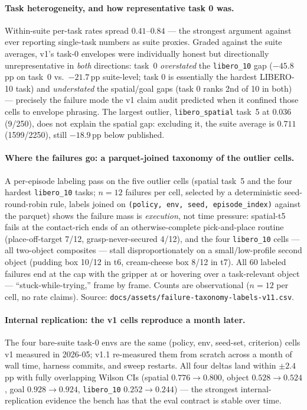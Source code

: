 \documentclass[10pt]{article}
\begin{document}
\paragraph{Task heterogeneity, and how representative task 0 was.}
Within-suite per-task rates spread $0.41$--$0.84$ --- the strongest
argument against ever reporting single-task numbers as suite proxies.
Graded against the
suite averages, v1's task-0 envelopes were individually honest but
directionally unrepresentative in \emph{both} directions: task~0
\emph{overstated} the \texttt{libero\_10} gap ($-45.8$\,pp on task~0 vs.\
$-21.7$\,pp suite-level; task 0 is essentially the hardest LIBERO-10
task) and \emph{understated} the spatial/goal gaps (task 0 ranks 2nd of
10 in both) --- precisely the failure mode the v1 claim audit predicted
when it confined those cells to envelope phrasing. The largest
outlier, \texttt{libero\_spatial} task~5 at $0.036$ (9/250), does not
explain the spatial gap: excluding it, the suite average is $0.711$
(1599/2250), still $-18.9$\,pp below published.

\paragraph{Where the failures go: a parquet-joined taxonomy of the
outlier cells.}
A per-episode labeling pass on the five outlier cells (spatial task~5 and
the four hardest \texttt{libero\_10} tasks; $n{=}12$ failures per cell,
selected by a deterministic seed-round-robin rule, labels joined on
\texttt{(policy, env, seed, episode\_index)} against the parquet) shows
the failure mass is \emph{execution}, not time pressure: spatial-t5
fails at the contact-rich ends of an otherwise-complete pick-and-place
routine (place-off-target 7/12, grasp-never-secured 4/12), and the four
\texttt{libero\_10} cells --- all two-object composites --- stall
disproportionately on a small/low-profile second object (pudding box
10/12 in t6, cream-cheese box 8/12 in t7). All 60 labeled failures end at
the cap with the gripper at or hovering over a task-relevant object ---
``stuck-while-trying,'' frame by frame. Counts are observational ($n{=}12$
per cell, no rate claims). Source:
\texttt{docs/assets/failure-taxonomy-labels-v11.csv}.

\paragraph{Internal replication: the v1 cells reproduce a month later.}
The four bare-suite task-0 envs are the same (policy, env, seed-set,
criterion) cells v1 measured in 2026-05; v1.1 re-measured them from
scratch across a month of wall time, harness commits, and sweep restarts.
All four deltas land within $\pm2.4$\,pp with fully overlapping Wilson
CIs (spatial $0.776\to0.800$, object $0.528\to0.524$, goal
$0.928\to0.924$, \texttt{libero\_10} $0.252\to0.244$) --- the strongest
internal-replication evidence the bench has that the eval contract is
stable over time.
\end{document}
